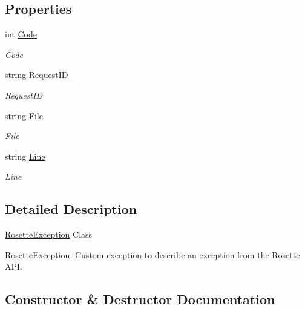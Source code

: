 \subsection*{Properties}
\begin{DoxyCompactItemize}
\item 
int \hyperlink{classrosette__api_1_1_rosette_exception_a2c6de2baf841c9b0453058968345b082}{Code}
\begin{DoxyCompactList}\small\item\em Code \end{DoxyCompactList}\item 
string \hyperlink{classrosette__api_1_1_rosette_exception_a124d4746ae63df0352290ac841019163}{Request\+I\+D}
\begin{DoxyCompactList}\small\item\em Request\+I\+D \end{DoxyCompactList}\item 
string \hyperlink{classrosette__api_1_1_rosette_exception_a060ff0690a35a0afbe15ecebe892a5a7}{File}
\begin{DoxyCompactList}\small\item\em File \end{DoxyCompactList}\item 
string \hyperlink{classrosette__api_1_1_rosette_exception_a30a50a43d7edb20f3176ae4f048fa976}{Line}
\begin{DoxyCompactList}\small\item\em Line \end{DoxyCompactList}\end{DoxyCompactItemize}


\subsection{Detailed Description}
\hyperlink{classrosette__api_1_1_rosette_exception}{Rosette\+Exception} Class 

\hyperlink{classrosette__api_1_1_rosette_exception}{Rosette\+Exception}\+: Custom exception to describe an exception from the Rosette A\+P\+I. 

\subsection{Constructor \& Destructor Documentation}
\hypertarget{classrosette__api_1_1_rosette_exception_a065c5e007dad0541bdfa7cab0400b6b0}{}
